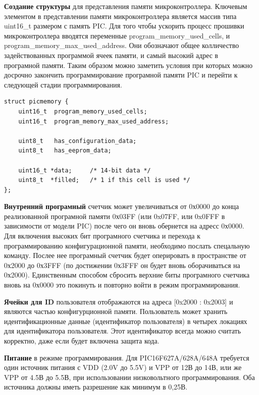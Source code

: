 \textbf{Создание структуры} для представления памяти микроконтроллера. 
Ключевым элементом в представлении памяти микроконтроллера является массив типа uint16_t размером с память PIC.
Для того чтобы ускорить процесс прошивки микроконтроллера вводятся переменные program_memory_used_cells, и program_memory_max_used_address. Они обозначают общее колличество задействованных программой ячеек памяти, и самый высокий адрес в програмной памяти. Таким образом можно заметить условия при которых можно досрочно закончить программирование програмной памяти PIC и перейти к следующей стадии программирования.

\begin{small}
\begin{verbatim}
struct picmemory {
    uint16_t  program_memory_used_cells;
    uint16_t  program_memory_max_used_address;

    uint8_t   has_configuration_data;
    uint8_t   has_eeprom_data;

    uint16_t *data;     /* 14-bit data */
    uint8_t  *filled;   /* 1 if this cell is used */
};
\end{verbatim}
\end{small}

\textbf{Внутренний програмный}
счетчик может увеличиваться от 0х0000 до 
конца реализованной програмной памяти 0х03FF (или 0x07FF, или 0x0FFF в зависимости от модели PIC)
после чего он вновь обернется на адресс 0х0000.
Для включения высоких бит програмного счетчика и перехода
к программированию конфигурационной памяти, необходимо послать спецальную команду.
Послее нее програмный счетчик будет оперировать в пространстве от 0х2000 до 0х3FFF
(по достижении 0х3FFF он будет вновь оборачиваться на 0х2000). Единственным 
способом сбросить верхние биты програмного счетчика вновь на 0х0000 это покинуть и
повторно войти в режим программирования.

\textbf{Ячейки для ID}
пользователя отображаются на адреса [0x2000 : 0x2003] и являются 
частью конфигурционной памяти. Пользователь может хранить 
идентификационные данные (идентификатор пользователя) в
четырех локациях для идентификатора пользователя. Этот идентификатор всегда можно считать
корректно, даже если будет включена защита кода.

\textbf{Питание}
в режиме программирования. Для PIC16F627A/628A/648A требуется один источник питания с VDD 
(2.0V до 5.5V) и VPP от 12В до 14В, или же VPP от 4.5В до 5.5В, 
при использовании низковольтного программирования. 
Оба источника должны иметь разрешение как минимум в 0,25В.

